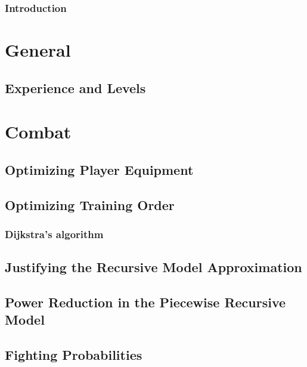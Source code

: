 \documentclass[10pt,a4paper]{report}
\begin{document}
	
	\tableofcontents
	\newpage

	\section*{Introduction}
		
	
	\part{General}
		\chapter{Experience and Levels}\label{chp:experience_and_levels}
			

	\part{Combat}
		
		
		
		
		
		\chapter{Optimizing Player Equipment}
			
		\chapter{Optimizing Training Order}
			\section{Dijkstra's algorithm}
		
		\begin{appendices}
			\chapter{Justifying the Recursive Model Approximation}\label{combat-app:recursive_justification}
				
			\chapter{Power Reduction in the Piecewise Recursive Model}\label{combat-app:power_reduction}
				
			\chapter{Fighting Probabilities}
				
		\end{appendices}
\end{document}
